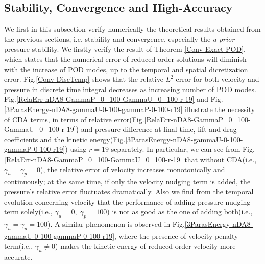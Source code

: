 \documentclass[10pt,twoside,openany,UTF8,CJK]{article}
\begin{document}
	\subsection{Stability, Convergence and High-Accuracy}
	\indent We first in this subsection verify numerically the theoretical results obtained from the previous sections, i.e. stability and convergence, especially the {\itshape a prior} pressure stability. We firstly verify the result of Theorem \ref{Conv-Exact-POD}, which states that the numerical error of reduced-order solutions will diminish with the increase of POD modes, up to the temporal and spatial dicretization error. Fig.\ref{Conv-DiscTemp} shows that the relative $L^2$ error for both velocity and pressure in discrete time integral decreases as increasing number of POD modes. Fig.\ref{RelaErr-nDA8-GammaP_0_100-GammaU_0_100-r-19} and Fig.\ref{3ParasEnergy-nDA8-gammaU-0-100-gammaP-0-100-r19} illustrate the necessity of CDA terms, in terms of relative error(Fig.\ref{RelaErr-nDA8-GammaP_0_100-GammaU_0_100-r-19}) and pressure difference at final time, lift and drag coefficients and the kinetic energy(Fig.\ref{3ParasEnergy-nDA8-gammaU-0-100-gammaP-0-100-r19}) using $r=19$ separately. In particular, we can see from Fig.\ref{RelaErr-nDA8-GammaP_0_100-GammaU_0_100-r-19} that without CDA(i.e., $\gamma_u=\gamma_p=0$), the relative error of velocity increases monotonically and continuously; at the same time, if only the velocity nudging term is added, the pressure's relative error fluctuates dramatically. Also we find from the temporal evolution concerning velocity that the performance of adding pressure nudging term solely(i.e., $\gamma_u=0,\;\gamma_p=100$) is not as good as the one of adding both(i.e., $\gamma_u=\gamma_p=100$). A similar phenomenon is observed in Fig.\ref{3ParasEnergy-nDA8-gammaU-0-100-gammaP-0-100-r19}, where the presence of velocity penalty term(i.e., $\gamma_u\neq 0$) makes the kinetic energy of reduced-order velocity more accurate.  \\
\end{document}
